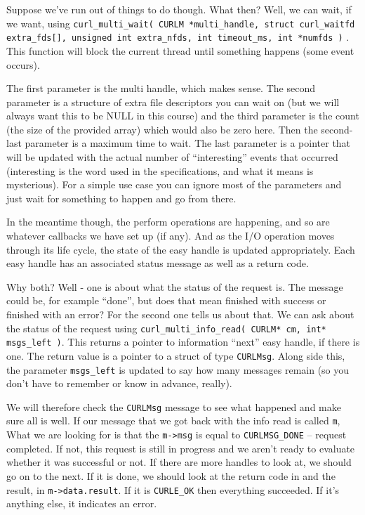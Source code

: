 Suppose we've run out of things to do though. What then? Well, we can wait, if we want, using \texttt{curl\_multi\_wait( CURLM *multi\_handle, struct curl\_waitfd extra\_fds[], unsigned int extra\_nfds, int timeout\_ms, int *numfds )} . This function will block the current thread until something happens (some event occurs).

The first parameter is the multi handle, which makes sense. The second parameter is a structure of extra file descriptors you can wait on (but we will always want this to be NULL in this course) and the third parameter is the count (the size of the provided array) which would also be zero here. Then the second-last parameter is a maximum time to wait. The last parameter is a pointer that will be updated with the actual number of ``interesting'' events that occurred (interesting is the word used in the specifications, and what it means is mysterious). For a simple use case you can ignore most of the parameters and just wait for something to happen and go from there.

In the meantime though, the perform operations are happening, and so are whatever callbacks we have set up (if any). And as the I/O operation moves through its life cycle, the state of the easy handle is updated appropriately. Each easy handle has an associated status message as well as a return code.

Why both? Well - one is about what the status of the request is. The message could be, for example ``done'', but does that mean finished with success or finished with an error? For the second one tells us about that. We can ask about the status of the request using \texttt{curl\_multi\_info\_read( CURLM* cm, int* msgs\_left )}. This returns a pointer to information ``next'' easy handle, if there is one. The return value is a pointer to a struct of type \texttt{CURLMsg}. Along side this, the parameter \texttt{msgs\_left} is updated to say how many messages remain (so you don't have to remember or know in advance, really). 

We will therefore check the \texttt{CURLMsg} message to see what happened and make sure all is well. If our message that we got back with the info read is called \texttt{m}, What we are looking for is that the \texttt{m->msg} is equal to \texttt{CURLMSG\_DONE} -- request completed. If not, this request is still in progress and we aren't ready to evaluate whether it was successful or not. If there are more handles to look at, we should go on to the next. If it is done, we should look at the return code in and the result, in \texttt{m->data.result}. If it is \texttt{CURLE\_OK} then everything succeeded. If it's anything else, it indicates an error.

